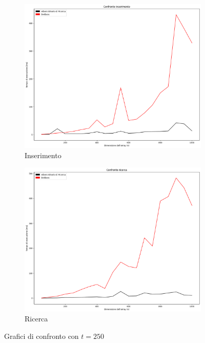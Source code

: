 \begin{figure}[H]
    \centering
    \begin{subfigure}[b]{0.49\textwidth}
        \centering
        \includegraphics[width=\textwidth]{comparison-graphs/insert-ms-t250.png}
        \caption{Inserimento}
        \label{fig:compgraphinserttimet250}
    \end{subfigure}
    \hfill
    \begin{subfigure}[b]{0.49\textwidth}
        \centering
        \includegraphics[width=\textwidth]{comparison-graphs/search-ms-t250.png}
        \caption{Ricerca}
        \label{fig:compgraphsearchtimet250}
    \end{subfigure}
    \caption{Grafici di confronto con $t=250$}
    \label{fig:compgraphtimest250}
\end{figure}

